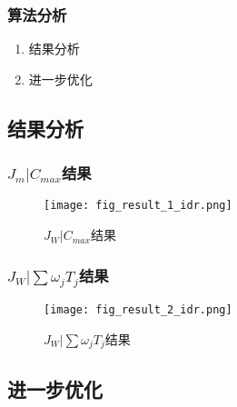 \begin{frame}
    \frametitle{算法分析}
    \begin{enumerate}
        \item 结果分析
        \item 进一步优化
    \end{enumerate}
\end{frame}

\subsection{结果分析}
\begin{frame}
    \frametitle{$J_m|C_{max}$结果}
    \begin{figure}
        \texttt{[image: fig\_result\_1\_idr.png]}
        \caption{$J_W|C_{max}$结果}
        \label{fig:result_1}
    \end{figure}
\end{frame}

\begin{frame}
    \frametitle{$J_W|\sum \omega_jT_j$结果}
    \begin{figure}
        \texttt{[image: fig\_result\_2\_idr.png]}
        \caption{$J_W|\sum \omega_jT_j$结果}
        \label{fig:result_2}
    \end{figure}    
\end{frame}

\subsection{进一步优化}

